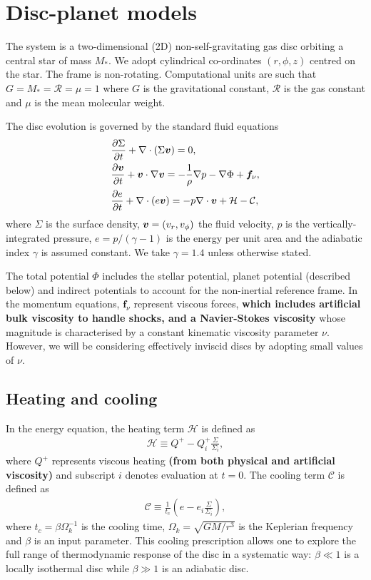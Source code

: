 \section{Disc-planet models}\label{model}
The system is a two-dimensional (2D) non-self-gravitating gas disc orbiting
a central star of mass $M_*$. We adopt cylindrical
co-ordinates $(r,\phi,z)$ centred on the star. The frame is   
non-rotating. Computational units are such that 
$G=M_*=\mathcal{R}=\mu=1$ where $G$ is the gravitational constant,
$\mathcal{R}$ is the gas constant and $\mu$ is the mean molecular
weight. 

The disc evolution is governed by the standard fluid equations  
\begin{align}\label{3d_gov_eq}
  &\frac{\p\Sigma}{\p t}+\nabla\cdot(\Sigma \bv)=0, \\
  & \frac{\p\bv}{\p t}+\bv\cdot\nabla\bv= -\frac{1}{\rho}\nabla p 
  - \nabla{\Phi} + \bm{f}_\nu,\\
  & \frac{\p e}{\p t} + \nabla\cdot(e\bv) = -p\nabla\cdot\bv +
  \mathcal{H} - \mathcal{C}, %
\end{align}
where $\Sigma$ is the surface density, $\bm{v} = (v_r,v_\phi)$ the fluid
velocity, $p$ is the vertically-integrated pressure, $e=p/(\gamma-1)$ is the energy
per unit area and the adiabatic index $\gamma$ is assumed
constant. We take $\gamma=1.4$ unless otherwise stated. 

The total potential $\Phi$ includes the stellar potential, planet potential
(described below) 
and indirect potentials to account for the non-inertial reference
frame. 
In the momentum equations, $\bm{f}_\nu$ represent viscous forces, {\bf
which includes artificial bulk viscosity to handle shocks, and a
Navier-Stokes viscosity} whose magnitude is  
characterised by a constant kinematic viscosity parameter
$\nu$. However, we will be considering effectively inviscid discs by
adopting small values of $\nu$.  

\subsection{Heating and cooling}
In the energy equation, the heating term $\mathcal{H}$ is defined as 
\begin{align}
  \mathcal{H} \equiv Q^+ - Q^+_i\frac{\Sigma}{\Sigma_i}, 
\end{align}
where $Q^+$ represents viscous heating {\bf(from both physical and
  artificial viscosity)} and subscript $i$ denotes
evaluation at $t=0$. The cooling term $\mathcal{C}$ is defined as
\begin{align}
  \mathcal{C} \equiv \frac{1}{t_c}\left(e -
  e_i\frac{\Sigma}{\Sigma_i}\right),  
\end{align}
where $t_c = \beta\Omega_k^{-1}$ is the cooling time,
$\Omega_k=\sqrt{GM/r^3}$ is the Keplerian frequency and $\beta$ is an
input parameter. This cooling prescription allows one 
to explore the full range of thermodynamic response of the disc in a 
systematic way: $\beta\ll1$ is a locally isothermal disc while
$\beta\gg1$ is an adiabatic disc.  


